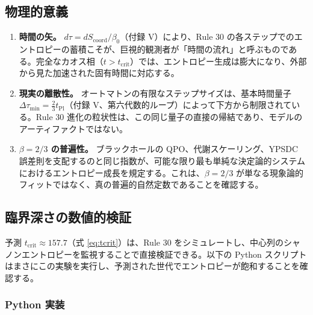 \documentclass[11pt,a4paper]{article}
\begin{document}
	\subsection{物理的意義}
	\label{subsec:implications}
	
	\begin{enumerate}
		\item \textbf{時間の矢。} \(d\tau = dS_{\mathrm{coord}}/\beta_{0}\)（付録 V）により、Rule 30 の各ステップでのエントロピーの蓄積こそが、巨視的観測者が「時間の流れ」と呼ぶものである。完全なカオス相（\(t > t_{\mathrm{crit}}\)）では、エントロピー生成は膨大になり、外部から見た加速された固有時間に対応する。
		\item \textbf{現実の離散性。} オートマトンの有限なステップサイズは、基本時間量子 \(\Delta\tau_{\min} = \frac{2}{3}t_{\mathrm{Pl}}\)（付録 V、第六代数的ループ）によって下方から制限されている。Rule 30 進化の粒状性は、この同じ量子の直接の帰結であり、モデルのアーティファクトではない。
		\item \textbf{\(\beta=2/3\) の普遍性。} ブラックホールの QPO、代謝スケーリング、YPSDC 誤差則を支配するのと同じ指数が、可能な限り最も単純な決定論的システムにおけるエントロピー成長を規定する。これは、\(\beta=2/3\) が単なる現象論的フィットではなく、真の普遍的自然定数であることを確認する。
	\end{enumerate}
	
	\subsection{臨界深さの数値的検証}
	\label{subsec:verification}
	
	予測 \(t_{\mathrm{crit}} \approx 157.7\)（式 \ref{eq:tcrit}）は、Rule 30 をシミュレートし、中心列のシャノンエントロピーを監視することで直接検証できる。以下の Python スクリプトはまさにこの実験を実行し、予測された世代でエントロピーが飽和することを確認する。
	
	\subsubsection*{Python 実装}
	
\end{document}
